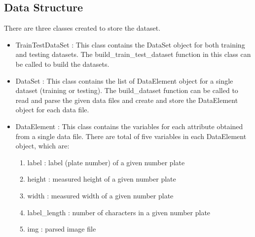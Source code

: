 \documentclass[conference]{IEEEtran}
\begin{document}
\subsection{Data Structure}
There are three classes created to store the dataset.\\
\begin{itemize}
\item TrainTestDataSet : This class contains the DataSet object for both training and testing datasets. The build\_train\_test\_dataset function in this class can be called to build the datasets.
\item DataSet : This class contains the list of DataElement object for a single dataset (training or testing). The build\_dataset function can be called to read and parse the given data files and create and store the DataElement object for each data file.
\item DataElement : This class contains the variables for each attribute obtained from a single data file. There are total of five variables in each DataElement object, which are:\\
\begin{enumerate}
\item label : label (plate number) of a given number plate
\item height : measured height of a given number plate
\item width : measured width of a given number plate
\item label\_length  : number of characters in a given number plate
\item img : parsed image file
\end{enumerate}
\end{itemize}
\end{document}
